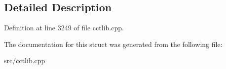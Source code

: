 \subsection{Detailed Description}


Definition at line 3249 of file cctlib.\-cpp.



The documentation for this struct was generated from the following file\-:\begin{DoxyCompactItemize}
\item 
src/cctlib.\-cpp\end{DoxyCompactItemize}
